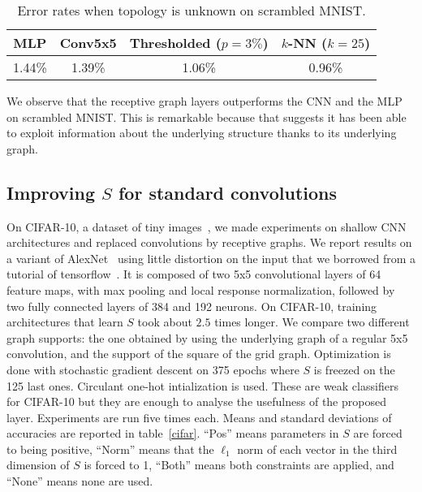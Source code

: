 \begin{table}[H]
  \caption{Error rates when topology is unknown on scrambled MNIST.}
  \begin{center}
    \bgroup
    \def\arraystretch{1.5}%
    \begin{tabular}{|c|c|c|c|}
      \hline
      MLP & Conv5x5 & Thresholded ($p=3\%$) & $k$-NN ($k=25$)\\
      \hline
      1.44\% & 1.39\% & 1.06\% & 0.96\%\\
      \hline
    \end{tabular}
    \egroup
  \end{center}
  \label{covar}
  \end{table}

We observe that the receptive graph layers outperforms the CNN and the MLP on scrambled MNIST. This is remarkable because that suggests it has been able to exploit information about the underlying structure thanks to its underlying graph.

\subsection{Improving $S$ for standard convolutions}

On CIFAR-10, a dataset of tiny images~\citep{krizhevsky2009learning}, we made experiments on shallow CNN architectures and replaced convolutions by receptive graphs. We report results on a variant of AlexNet~\cite{krizhevsky2012imagenet} using little distortion on the input that we borrowed from a tutorial of tensorflow~\cite{tensorflow2015-whitepaper}.
It is composed of two 5x5 convolutional layers of 64 feature maps, with max pooling and local response normalization, followed by two fully connected layers of 384 and 192 neurons.
On CIFAR-10, training architectures that learn $S$ took about $2.5$ times longer.
We compare two different graph supports: the one obtained by using the underlying graph of a regular 5x5 convolution, and the support of the square of the grid graph. Optimization is done with stochastic gradient descent on 375 epochs where $S$ is freezed on the 125 last ones. Circulant one-hot intialization is used. These are weak classifiers for CIFAR-10 but they are enough to analyse the usefulness of the proposed layer.
Experiments are run five times each. Means and standard deviations of accuracies are reported in table~\ref{cifar}. ``Pos'' means parameters in $S$ are forced to being positive, ``Norm'' means that the $\ell_1$ norm of each vector in the third dimension of $S$ is forced to 1, ``Both'' means both constraints are applied, and ``None'' means none are used.

